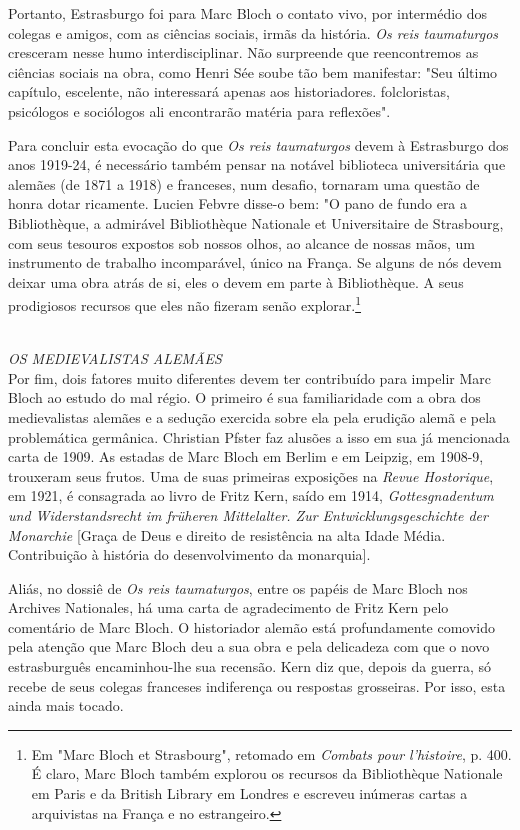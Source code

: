\documentclass[a5paper]{book}
\begin{document}
Portanto, Estrasburgo foi para Marc Bloch o contato vivo, por intermédio dos colegas e amigos, com as ciências sociais, irmãs da história. \textit{Os reis taumaturgos} cresceram nesse humo interdisciplinar. Não surpreende que reencontremos as ciências sociais na obra, como Henri Sée soube tão bem manifestar: "Seu último capítulo, escelente, não interessará apenas aos historiadores. folcloristas, psicólogos e sociólogos ali encontrarão matéria para ref{\kern0pt}lexões".

Para concluir esta evocação do que \textit{Os reis taumaturgos} devem à Estrasburgo dos anos 1919-24, é necessário também pensar na notável biblioteca universitária que alemães (de 1871 a 1918) e franceses, num desaf{\kern0pt}io, tornaram uma questão de honra dotar ricamente. Lucien Febvre disse-o bem: "O pano de fundo era a Bibliothèque, a admirável Bibliothèque Nationale et Universitaire de Strasbourg, com seus tesouros expostos sob nossos olhos, ao alcance de nossas mãos, um instrumento de trabalho incomparável, único na França. Se alguns de nós devem deixar uma obra atrás de si, eles o devem em parte à Bibliothèque. A seus prodigiosos recursos que eles não f{\kern0pt}izeram senão explorar.\footnote{Em "Marc Bloch et Strasbourg", retomado em \textit{Combats pour l'histoire}, p. 400. É claro, Marc Bloch também explorou os recursos da Bibliothèque Nationale em Paris e da British Library em Londres e escreveu inúmeras cartas a arquivistas na França e no estrangeiro.}

~\\ \large \textit{OS MEDIEVALISTAS ALEMÃES} ~\\

Por f{\kern0pt}im, dois fatores muito diferentes devem ter contribuído para impelir Marc Bloch ao estudo do mal régio. O primeiro é sua familiaridade com a obra dos medievalistas alemães e a sedução exercida sobre ela pela erudição alemã e pela problemática germânica. Christian Pfster faz alusões a isso em sua já mencionada carta de 1909. As estadas de Marc Bloch em Berlim e em Leipzig, em 1908-9, trouxeram seus frutos. Uma de suas primeiras exposições na \textit{Revue Hostorique}, em 1921, é consagrada ao livro de Fritz Kern, saído em 1914, \textit{Gottesgnadentum und Widerstandsrecht im früheren Mittelalter. Zur Entwicklungsgeschichte der Monarchie} [Graça de Deus e direito de resistência na alta Idade Média. Contribuição à história do desenvolvimento da monarquia].

Aliás, no dossiê de \textit{Os reis taumaturgos}, entre os papéis de Marc Bloch nos Archives Nationales, há uma carta de agradecimento de Fritz Kern pelo comentário de Marc Bloch. O historiador alemão está profundamente comovido pela atenção que Marc Bloch deu a sua obra e pela delicadeza com que o novo estrasburguês encaminhou-lhe sua recensão. Kern diz que, depois da guerra, só recebe de seus colegas franceses indiferença ou respostas grosseiras. Por isso, esta ainda mais tocado.
\end{document}

